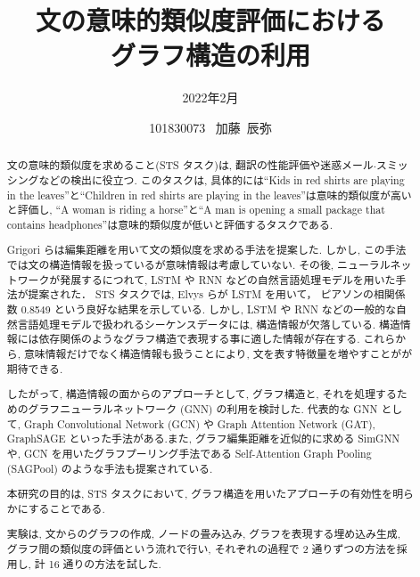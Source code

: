 \documentclass[a4paper,12pt,dvipdfmx]{thesis} %
\title{文の意味的類似度評価における\\グラフ構造の利用}
\author{2022年2月}
\date{101830073 \, 加藤~辰弥}
\begin{document}
\maketitle

\setcounter{tocdepth}{2}

\setlength{\baselineskip}{1.85zw}
\setlength{\textheight}{31\baselineskip}

\setlength{\baselineskip}{1.63zw}
\setlength{\textheight}{36\baselineskip}


\begin{abstract}
	文の意味的類似度を求めること(STS タスク)は, 翻訳の性能評価や迷惑メール$\cdot$スミッシングなどの検出に役立つ.
	このタスクは, 具体的には``Kids in red shirts are playing in the leaves''と``Children in red shirts are playing in the leaves''は意味的類似度が高いと評価し, ``A woman is riding a horse''と``A man is opening a small package that contains headphones''は意味的類似度が低いと評価するタスクである.
	\par Grigori らは編集距離を用いて文の類似度を求める手法を提案した. しかし, この手法では文の構造情報を扱っているが意味情報は考慮していない.
	その後, ニューラルネットワークが発展するにつれて, LSTM や RNN などの自然言語処理モデルを用いた手法が提案された．
	STS タスクでは, Elvys らが LSTM を用いて， ピアソンの相関係数 0.8549 という良好な結果を示している.
	しかし, LSTM や RNN などの一般的な自然言語処理モデルで扱われるシーケンスデータには, 構造情報が欠落している. 構造情報には依存関係のようなグラフ構造で表現する事に適した情報が存在する.
	これらから, 意味情報だけでなく構造情報も扱うことにより, 文を表す特徴量を増やすことがが期待できる.
	\par したがって, 構造情報の面からのアプローチとして, グラフ構造と, それを処理するためのグラフニューラルネットワーク (GNN) の利用を検討した.
	代表的な GNN として, Graph Convolutional Network (GCN) や Graph Attention Network (GAT), GraphSAGE といった手法がある.また, グラフ編集距離を近似的に求める SimGNN や, GCN を用いたグラフプーリング手法である Self-Attention Graph Pooling (SAGPool) のような手法も提案されている.
	\par 本研究の目的は, STS タスクにおいて, グラフ構造を用いたアプローチの有効性を明らかにすることである.
	\par 実験は, 文からのグラフの作成, ノードの畳み込み, グラフを表現する埋め込み生成, グラフ間の類似度の評価という流れで行い, それぞれの過程で 2 通りずつの方法を採用し, 計 16 通りの方法を試した.

\end{abstract}
\end{document}
